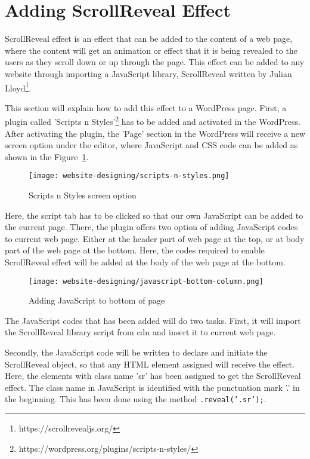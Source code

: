 \section{Adding ScrollReveal Effect}
ScrollReveal effect is an effect that can be added to the content of a web page, where the content will get an animation or effect that it is being revealed to the users as they scroll down or up through the page. This effect can be added to any website through importing a JavaScript library, ScrollReveal written by Julian Lloyd\footnote{https://scrollrevealjs.org/}.

This section will explain how to add this effect to a WordPress page. First, a plugin called 'Scripts n Styles'\footnote{https://wordpress.org/plugins/scripts-n-styles/} has to be added and activated in the WordPress. After activating the plugin, the 'Page' section in the WordPress will receive a new screen option under the editor, where JavaScript and CSS code can be added as shown in the Figure~\ref{scripts-n-styles}.

\begin{figure}[ht]
\centering
\caption{Scripts n Styles screen option}
\label{scripts-n-styles}
\texttt{[image: website-designing/scripts-n-styles.png]}
\end{figure}

Here, the script tab has to be clicked so that our own JavaScript can be added to the current page. There, the plugin offers two option of adding JavaScript codes to current web page. Either at the header part of web page at the top, or at body part of the web page at the bottom. Here, the codes required to enable ScrollReveal effect will be added at the body of the web page at the bottom.

\begin{figure}[ht]
\centering
\caption{Adding JavaScript to bottom of page}
\label{javascript-bottom-column}
\texttt{[image: website-designing/javascript-bottom-column.png]}
\end{figure}

The JavaScript codes that has been added will do two tasks. First, it will import the ScrollReveal library script from \ac{cdn} and insert it to current web page.

Secondly, the JavaScript code will be written to declare and initiate the ScrollReveal object, so that any HTML element assigned will receive the effect. Here, the elements with class name 'sr' has been assigned to get the ScrollReveal effect. The class name in JavaScript is identified with the punctuation mark '.' in the beginning. This has been done using the method \texttt{.reveal('.sr');}.

